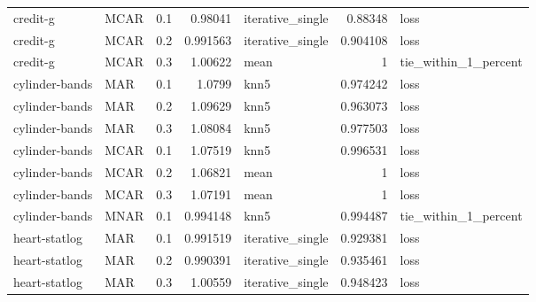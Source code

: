 \begin{table}[ht]
{\begin{tabular}{llrrlrl}
 credit-g             & MCAR        &         0.1 &                          0.98041  & iterative\_single &                           0.88348  & loss                 \\
 credit-g             & MCAR        &         0.2 &                          0.991563 & iterative\_single &                           0.904108 & loss                 \\
 credit-g             & MCAR        &         0.3 &                          1.00622  & mean             &                           1        & tie\_within\_1\_percent \\
 cylinder-bands       & MAR         &         0.1 &                          1.0799   & knn5             &                           0.974242 & loss                 \\
 cylinder-bands       & MAR         &         0.2 &                          1.09629  & knn5             &                           0.963073 & loss                 \\
 cylinder-bands       & MAR         &         0.3 &                          1.08084  & knn5             &                           0.977503 & loss                 \\
 cylinder-bands       & MCAR        &         0.1 &                          1.07519  & knn5             &                           0.996531 & loss                 \\
 cylinder-bands       & MCAR        &         0.2 &                          1.06821  & mean             &                           1        & loss                 \\
 cylinder-bands       & MCAR        &         0.3 &                          1.07191  & mean             &                           1        & loss                 \\
 cylinder-bands       & MNAR        &         0.1 &                          0.994148 & knn5             &                           0.994487 & tie\_within\_1\_percent \\
 heart-statlog        & MAR         &         0.1 &                          0.991519 & iterative\_single &                           0.929381 & loss                 \\
 heart-statlog        & MAR         &         0.2 &                          0.990391 & iterative\_single &                           0.935461 & loss                 \\
 heart-statlog        & MAR         &         0.3 &                          1.00559  & iterative\_single &                           0.948423 & loss                 \\

\end{tabular}}
\end{table}

